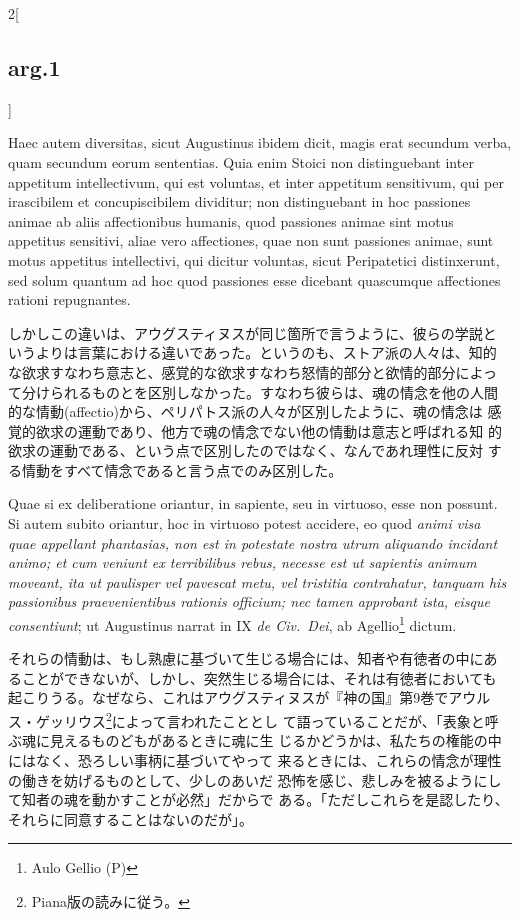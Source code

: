\documentclass[paper=a4paper,fontsize=10pt,jafontsize=9pt,titlepage]{jlreq}
\begin{document}
\begin{paracol}{2}[\subsection{arg.1}]
\switchcolumn*

Haec autem diversitas, sicut Augustinus ibidem dicit, magis erat
 secundum verba, quam secundum eorum sententias. Quia enim Stoici non
 distinguebant inter appetitum intellectivum, qui est voluntas, et
 inter appetitum sensitivum, qui per irascibilem et concupiscibilem
 dividitur; non distinguebant in hoc passiones animae ab aliis
 affectionibus humanis, quod passiones animae sint motus appetitus
 sensitivi, aliae vero affectiones, quae non sunt passiones animae,
 sunt motus appetitus intellectivi, qui dicitur voluntas, sicut
 Peripatetici distinxerunt, sed solum quantum ad hoc quod passiones
 esse dicebant quascumque affectiones rationi repugnantes.

\switchcolumn

しかしこの違いは、アウグスティヌスが同じ箇所で言うように、彼らの学説と
いうよりは言葉における違いであった。というのも、ストア派の人々は、知的
な欲求すなわち意志と、感覚的な欲求すなわち怒情的部分と欲情的部分によっ
て分けられるものとを区別しなかった。すなわち彼らは、魂の情念を他の人間
的な情動(affectio)から、ペリパトス派の人々が区別したように、魂の情念は
感覚的欲求の運動であり、他方で魂の情念でない他の情動は意志と呼ばれる知
的欲求の運動である、という点で区別したのではなく、なんであれ理性に反対
する情動をすべて情念であると言う点でのみ区別した。

\switchcolumn*

Quae si ex deliberatione oriantur, in sapiente, seu in virtuoso, esse
 non possunt. Si autem subito oriantur, hoc in virtuoso potest
 accidere, eo quod {\itshape animi visa quae appellant phantasias, non
 est in potestate nostra utrum aliquando incidant animo; et cum
 veniunt ex terribilibus rebus, necesse est ut sapientis animum
 moveant, ita ut paulisper vel pavescat metu, vel tristitia
 contrahatur, tanquam his passionibus praevenientibus rationis
 officium; nec tamen approbant ista, eisque consentiunt}; ut
 Augustinus narrat in IX {\itshape de Civ.~Dei}, ab Agellio\footnote{Aulo Gellio (P)} dictum.

\switchcolumn

それらの情動は、もし熟慮に基づいて生じる場合には、知者や有徳者の中にあ
ることができないが、しかし、突然生じる場合には、それは有徳者においても
起こりうる。なぜなら、これはアウグスティヌスが『神の国』第9巻でアウル
ス・ゲッリウス\footnote{Piana版の読みに従う。}によって言われたこととし
て語っていることだが、「表象と呼ぶ魂に見えるものどもがあるときに魂に生
じるかどうかは、私たちの権能の中にはなく、恐ろしい事柄に基づいてやって
来るときには、これらの情念が理性の働きを妨げるものとして、少しのあいだ
恐怖を感じ、悲しみを被るようにして知者の魂を動かすことが必然」だからで
ある。「ただしこれらを是認したり、それらに同意することはないのだが」。


\end{paracol}
\end{document}
